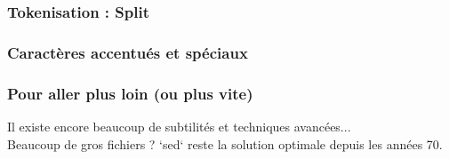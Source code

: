 \begin{frame}
  \frametitle{Tokenisation : Split}
\end{frame}

\begin{frame}
  \frametitle{Caractères accentués et spéciaux}
\end{frame}

\begin{frame}
  \frametitle{Pour aller plus loin (ou plus vite)}
  Il existe encore beaucoup de subtilités et techniques avancées...\\
  \newline
  Beaucoup de gros fichiers ? `sed` reste la solution optimale depuis les années 70.
\end{frame}

